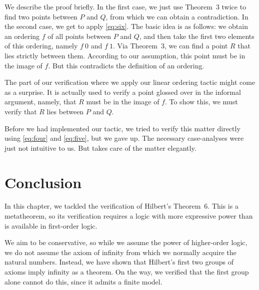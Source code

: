 We describe the proof briefly. In the first case, we just use Theorem~3 twice to find two points between $P$ and $Q$, from which we can obtain a contradiction. In the second case, we get to apply \ref{eq:six}. The basic idea is as follows: we obtain an ordering $f$ of all points between $P$ and $Q$, and then take the first two elements of this ordering, namely $f\ 0$ and $f\ 1$. Via Theorem~3, we can find a point $R$ that lies strictly between them. According to our assumption, this point must be in the image of $f$. But this contradicts the definition of an ordering.

The part of our verification where we apply our linear ordering tactic might come as a surprise. It is actually used to verify a point glossed over in the informal argument, namely, that $R$ must be in the image of $f$. To show this, we must verify that $R$ lies between $P$ and $Q$.

Before we had implemented our tactic, we tried to verify this matter directly using \ref{eq:four} and \ref{eq:five}, but we gave up. The necessary case-analyses were just not intuitive to us. But  takes care of the matter elegantly.

\linebreak

\section{Conclusion}
In this chapter, we tackled the verification of Hilbert's Theorem~6. This is a metatheorem, so its verification requires a logic with more expressive power than is available in first-order logic. 

We aim to be conservative, so while we assume the power of higher-order logic, we do not assume the axiom of infinity from which we normally acquire the natural numbers. Instead, we have shown that Hilbert's first two groups of axioms imply infinity as a theorem. On the way, we verified that the first group alone cannot do this, since it admits a finite model.

